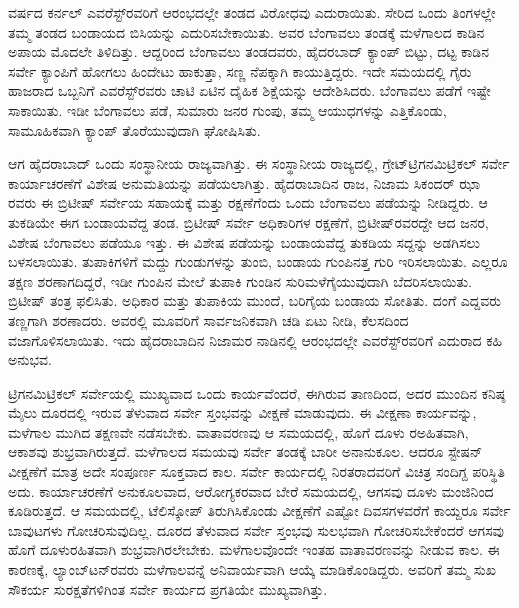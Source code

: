  ವರ್ಷದ ಕರ್ನಲ್​ ಎವರೆಸ್ಟ್​ರವರಿಗೆ ಆರಂಭದಲ್ಲೇ ತಂಡದ ವಿರೋಧವು ಎದುರಾಯಿತು. ಸೇರಿದ ಒಂದು ತಿಂಗಳಲ್ಲೇ ತಮ್ಮ ತಂಡದ ಬಂಡಾಯದ ಬಿಸಿಯನ್ನು ಎದುರಿಸಬೇಕಾಯಿತು. ಅವರ ಬೆಂಗಾವಲು ತಂಡಕ್ಕೆ ಮಳೆಗಾಲದ ಕಾಡಿನ ಅಪಾಯ ಮೊದಲೇ ತಿಳಿದಿತ್ತು. ಆದ್ದರಿಂದ ಬೆಂಗಾವಲು ತಂಡದವರು, ಹೈದರಬಾದ್​ ಕ್ಯಾಂಪ್​ ಬಿಟ್ಟು, ದಟ್ಟ ಕಾಡಿನ ಸರ್ವೇ ಕ್ಯಾಂಪಿಗೆ ಹೋಗಲು ಹಿಂದೇಟು ಹಾಕುತ್ತಾ, ಸಣ್ಣ ನೆಪಕ್ಕಾಗಿ ಕಾಯುತ್ತಿದ್ದರು. ಇದೇ ಸಮಯದಲ್ಲಿ ಗೈರು ಹಾಜರಾದ ಒಬ್ಬನಿಗೆ ಎವರೆಸ್ಟ್​ರವರು ಚಾಟಿ ಏಟಿನ ದೈಹಿಕ ಶಿಕ್ಷೆಯನ್ನು ಆದೇಶಿಸಿದರು. ಬೆಂಗಾವಲು ಪಡೆಗೆ ಇಷ್ಟೇ ಸಾಕಾಯಿತು. ಇಡೀ ಬೆಂಗಾವಲು ಪಡೆ, ಸುಮಾರು  ಜನರ ಗುಂಪು, ತಮ್ಮ ಆಯುಧಗಳನ್ನು ಎತ್ತಿಕೊಂಡು, ಸಾಮೂಹಿಕವಾಗಿ ಕ್ಯಾಂಪ್​ ತೊರೆಯುವುದಾಗಿ ಘೋಷಿಸಿತು.

ಆಗ ಹೈದರಾಬಾದ್​ ಒಂದು ಸಂಸ್ಥಾನೀಯ ರಾಜ್ಯವಾಗಿತ್ತು. ಈ ಸಂಸ್ಥಾನೀಯ ರಾಜ್ಯದಲ್ಲಿ, ಗ್ರೇಟ್​ ಟ್ರಿಗನಮಿಟ್ರಿಕಲ್​ ಸರ್ವೇ ಕಾರ್ಯಾಚರಣೆಗೆ ವಿಶೇಷ ಅನುಮತಿಯನ್ನು ಪಡೆಯಲಾಗಿತ್ತು. ಹೈದರಾಬಾದಿನ ರಾಜ, ನಿಜಾಮ ಸಿಕಂದರ್​ ಝಾ ರವರು ಈ ಬ್ರಿಟೀಷ್​ ಸರ್ವೇಯ ಸಹಾಯಕ್ಕೆ ಮತ್ತು ರಕ್ಷಣೆಗೆಂದು ಒಂದು ಬೆಂಗಾವಲು ಪಡೆಯನ್ನು ನೀಡಿದ್ದರು. ಆ ತುಕಡಿಯೇ ಈಗ ಬಂಡಾಯವೆದ್ದ ತಂಡ. ಬ್ರಿಟೀಷ್​ ಸರ್ವೇ ಅಧಿಕಾರಿಗಳ ರಕ್ಷಣೆಗೆ, ಬ್ರಿಟೀಷ್​ರವರದ್ದೇ ಆದ  ಜನರ, ವಿಶೇಷ ಬೆಂಗಾವಲು ಪಡೆಯೂ ಇತ್ತು. ಈ ವಿಶೇಷ ಪಡೆಯನ್ನು ಬಂಡಾಯವೆದ್ದ ತುಕಡಿಯ ಸದ್ದನ್ನು ಅಡಗಿಸಲು ಬಳಸಲಾಯಿತು. ತುಪಾಕಿಗಳಿಗೆ ಮದ್ದು ಗುಂಡುಗಳನ್ನು ತುಂಬಿ, ಬಂಡಾಯ ಗುಂಪಿನತ್ತ ಗುರಿ ಇರಿಸಲಾಯಿತು. ಎಲ್ಲರೂ ತಕ್ಷಣ ಶರಣಾಗದಿದ್ದರೆ, ಇಡೀ ಗುಂಪಿನ ಮೇಲೆ ತುಪಾಕಿ ಗುಂಡಿನ ಸುರಿಮಳೆಗೈಯುವುದಾಗಿ ಬೆದರಿಸಲಾಯಿತು. ಬ್ರಿಟೀಷ್​ ತಂತ್ರ ಫಲಿಸಿತು. ಅಧಿಕಾರ ಮತ್ತು ತುಪಾಕಿಯ ಮುಂದೆ, ಬರಿಗೈಯ ಬಂಡಾಯ ಸೋತಿತು. ದಂಗೆ ಎದ್ದವರು ತಣ್ಣಗಾಗಿ ಶರಣಾದರು. ಅವರಲ್ಲಿ ಮೂವರಿಗೆ ಸಾರ್ವಜನಿಕವಾಗಿ ಚಡಿ ಏಟು ನೀಡಿ, ಕೆಲಸದಿಂದ ವಜಾಗೊಳಿಸಲಾಯಿತು. ಇದು ಹೈದರಾಬಾದಿನ ನಿಜಾಮರ ನಾಡಿನಲ್ಲಿ ಆರಂಭದಲ್ಲೇ ಎವರೆಸ್ಟ್​ರವರಿಗೆ ಎದುರಾದ ಕಹಿ ಅನುಭವ.

ಟ್ರಿಗನಮಿಟ್ರಿಕಲ್​ ಸರ್ವೇಯಲ್ಲಿ ಮುಖ್ಯವಾದ ಒಂದು ಕಾರ್ಯವೆಂದರೆ, ಈಗಿರುವ ತಾಣದಿಂದ, ಅದರ ಮುಂದಿನ ಕನಿಷ್ಠ  ಮೈಲು ದೂರದಲ್ಲಿ ಇರುವ ತೆಳುವಾದ ಸರ್ವೇ ಸ್ತಂಭವನ್ನು ವೀಕ್ಷಣೆ ಮಾಡುವುದು. ಈ ವೀಕ್ಷಣಾ ಕಾರ್ಯವನ್ನು, ಮಳೆಗಾಲ ಮುಗಿದ ತಕ್ಷಣವೇ ನಡೆಸಬೇಕು. ವಾತಾವರಣವು ಆ ಸಮಯದಲ್ಲಿ, ಹೊಗೆ ದೂಳು ರಅಹಿತವಾಗಿ, ಆಕಾಶವು ಶುಭ್ರವಾಗಿರುತ್ತದೆ. ಮಳೆಗಾಲದ ಸಮಯವು ಸರ್ವೇ ತಂಡಕ್ಕೆ ಬಾರೀ ಅನಾನುಕೂಲ. ಆದರೂ ಸ್ಟೇಷನ್​ ವೀಕ್ಷಣೆಗೆ ಮಾತ್ರ ಅದೇ ಸಂಪೂರ್ಣ ಸೂಕ್ತವಾದ ಕಾಲ. ಸರ್ವೇ ಕಾರ್ಯದಲ್ಲಿ ನಿರತರಾದವರಿಗೆ ವಿಚಿತ್ರ ಸಂದಿಗ್ದ ಪರಿಸ್ಥಿತಿ ಅದು. ಕಾರ್ಯಾಚರಣೆಗೆ ಅನುಕೂಲವಾದ, ಆರೋಗ್ಯಕರವಾದ ಬೇರೆ ಸಮಯದಲ್ಲಿ, ಆಗಸವು ದೂಳು ಮಂಜಿನಿಂದ ಕೂಡಿರುತ್ತದೆ. ಆ ಸಮಯದಲ್ಲಿ, ಟೆಲಿಸ್ಕೋಪ್​ ತಿರುಗಿಸಿಕೊಂಡು ವೀಕ್ಷಣೆಗೆ ಎಷ್ಟೋ ದಿವಸಗಳವರೆಗೆ ಕಾಯ್ದರೂ ಸರ್ವೇ ಬಾವುಟಗಳು ಗೋಚರಿಸುವುದಿಲ್ಲ. ದೂರದ ತೆಳುವಾದ ಸರ್ವೇ ಸ್ತಂಭವು ಸುಲಭವಾಗಿ ಗೋಚರಿಸಬೇಕೆಂದರೆ ಆಗಸವು ಹೊಗೆ ದೂಳುರಹಿತವಾಗಿ ಶುಭ್ರವಾಗಿರಲೇಬೇಕು. ಮಳೆಗಾಲವೊಂದೇ ಇಂತಹ ವಾತಾವರಣವನ್ನು ನೀಡುವ ಕಾಲ. ಈ ಕಾರಣಕ್ಕೆ, ಲ್ಯಾಂಬ್​ಟನ್​ರವರು ಮಳೆಗಾಲವನ್ನೆ ಅನಿವಾರ್ಯವಾಗಿ ಆಯ್ಕೆ ಮಾಡಿಕೊಂಡಿದ್ದರು. ಅವರಿಗೆ ತಮ್ಮ ಸುಖ ಸೌಕರ್ಯ ಸುರಕ್ಷತೆಗಳಿಗಿಂತ ಸರ್ವೇ ಕಾರ್ಯದ ಪ್ರಗತಿಯೇ ಮುಖ್ಯವಾಗಿತ್ತು.

